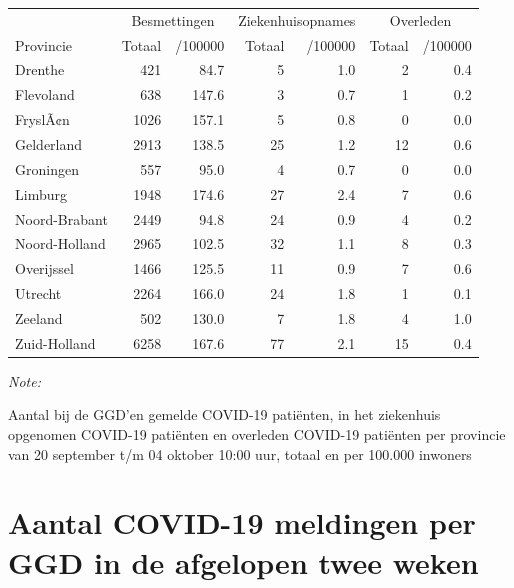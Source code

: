 \documentclass[
  english,
  man,floatsintext]{apa6}
\begin{document}
\begin{table}
\centering
\begin{threeparttable}
\begin{tabular}{lrrrrrr}
\toprule
\multicolumn{1}{c}{ } & \multicolumn{2}{c}{Besmettingen} & \multicolumn{2}{c}{Ziekenhuisopnames} & \multicolumn{2}{c}{Overleden} \\
\cmidrule(l{3pt}r{3pt}){2-3} \cmidrule(l{3pt}r{3pt}){4-5} \cmidrule(l{3pt}r{3pt}){6-7}
Provincie & Totaal & /100000 & Totaal & /100000 & Totaal & /100000\\
\midrule
Drenthe & 421 & 84.7 & 5 & 1.0 & 2 & 0.4\\
Flevoland & 638 & 147.6 & 3 & 0.7 & 1 & 0.2\\
FryslÃ¢n & 1026 & 157.1 & 5 & 0.8 & 0 & 0.0\\
Gelderland & 2913 & 138.5 & 25 & 1.2 & 12 & 0.6\\
Groningen & 557 & 95.0 & 4 & 0.7 & 0 & 0.0\\
Limburg & 1948 & 174.6 & 27 & 2.4 & 7 & 0.6\\
Noord-Brabant & 2449 & 94.8 & 24 & 0.9 & 4 & 0.2\\
Noord-Holland & 2965 & 102.5 & 32 & 1.1 & 8 & 0.3\\
Overijssel & 1466 & 125.5 & 11 & 0.9 & 7 & 0.6\\
Utrecht & 2264 & 166.0 & 24 & 1.8 & 1 & 0.1\\
Zeeland & 502 & 130.0 & 7 & 1.8 & 4 & 1.0\\
Zuid-Holland & 6258 & 167.6 & 77 & 2.1 & 15 & 0.4\\
\bottomrule
\end{tabular}
\begin{tablenotes}
\item \textit{Note: } 
\item Aantal bij de GGD’en gemelde COVID-19 patiënten, in het ziekenhuis opgenomen COVID-19 patiënten en overleden COVID-19 patiënten per provincie van 20 september t/m 04 oktober 10:00 uur, totaal en per 100.000 inwoners
\end{tablenotes}
\end{threeparttable}
\end{table}

\newpage

\hypertarget{aantal-covid-19-meldingen-per-ggd-in-de-afgelopen-twee-weken}{%
\section{Aantal COVID-19 meldingen per GGD in de afgelopen twee weken}\label{aantal-covid-19-meldingen-per-ggd-in-de-afgelopen-twee-weken}}
\end{document}
